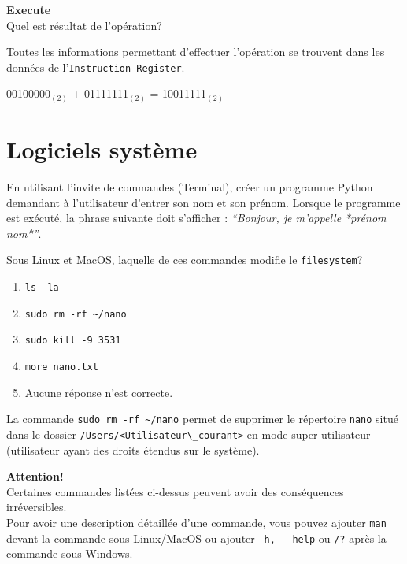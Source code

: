 \begin{Exercice}[5 minutes] \textbf{Execute}\\
    Quel est résultat de l'opération?
\end{Exercice}

   \begin{conseil}
        Toutes les informations permettant d’effectuer l’opération se trouvent dans les données de l’\lstinline{Instruction Register}.
    \end{conseil}

\begin{solution}
    00100000$_{(2)}$ + 01111111$_{(2)}$ = 10011111$_{(2)}$
\end{solution}


\section{Logiciels système}

\begin{Exercice}[10 minutes]
    En utilisant l’invite de commandes (Terminal), créer un programme Python demandant à l’utilisateur d’entrer son nom et son prénom. Lorsque le programme est exécuté, la phrase suivante doit s’afficher : \textit{``Bonjour, je m’appelle *prénom nom*''}.
\end{Exercice}

\begin{solution}
    
\end{solution}


\begin{Exercice}[5 minutes]
    Sous Linux et MacOS, laquelle de ces commandes modifie le \lstinline{filesystem}?
    \begin{enumerate}
        \item \lstinline{ls -la}
        \item \lstinline{sudo rm -rf ~/nano}
        \item \lstinline{sudo kill -9 3531}
        \item \lstinline{more nano.txt}
        \item Aucune réponse n'est correcte.
    \end{enumerate}
    \begin{solution}
        La commande \lstinline{sudo rm -rf ~/nano} permet de supprimer le répertoire \lstinline{nano} situé dans le dossier \lstinline{/Users/<Utilisateur\_courant>} en mode super-utilisateur (utilisateur ayant des droits étendus sur le système).
    \end{solution}
    \begin{attention}
        \textbf{Attention!}\\
        Certaines commandes listées ci-dessus peuvent avoir des conséquences irréversibles.\\
        Pour avoir une description détaillée d'une commande, vous pouvez ajouter \lstinline{man} devant la commande sous Linux/MacOS ou ajouter \lstinline{-h, --help} ou \lstinline{/?} après la commande sous Windows.
    \end{attention}
\end{Exercice}

